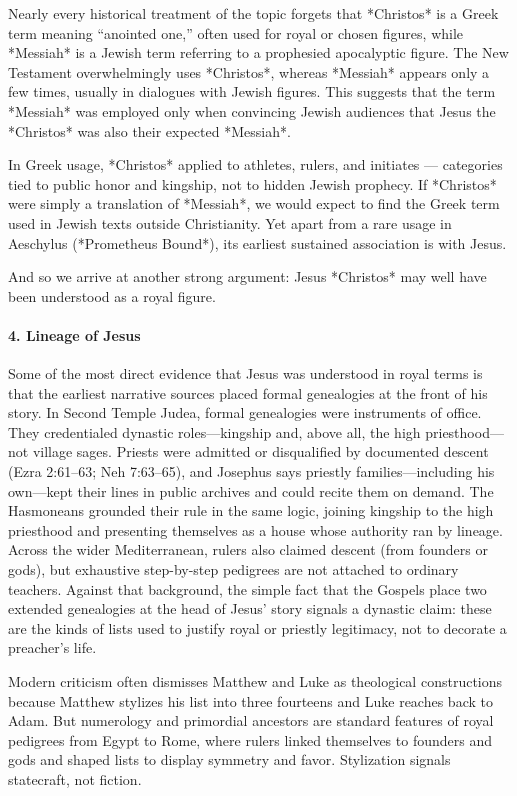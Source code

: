 Nearly every historical treatment of the topic forgets that *Christos* is a Greek term meaning “anointed one,” often used for royal or chosen figures, while *Messiah* is a Jewish term referring to a prophesied apocalyptic figure.
The New Testament overwhelmingly uses *Christos*, whereas *Messiah* appears only a few times, usually in dialogues with Jewish figures.
This suggests that the term *Messiah* was employed only when convincing Jewish audiences that Jesus the *Christos* was also their expected *Messiah*.

In Greek usage, *Christos* applied to athletes, rulers, and initiates — categories tied to public honor and kingship, not to hidden Jewish prophecy.
If *Christos* were simply a translation of *Messiah*, we would expect to find the Greek term used in Jewish texts outside Christianity.
Yet apart from a rare usage in Aeschylus (*Prometheus Bound*), its earliest sustained association is with Jesus.

And so we arrive at another strong argument: Jesus *Christos* may well have been understood as a royal figure.

\paragraph{4.
Lineage of Jesus}\label{par:lineage-of-jesus}

Some of the most direct evidence that Jesus was understood in royal terms is that the earliest narrative sources placed formal genealogies at the front of his story.
In Second Temple Judea, formal genealogies were instruments of office.
They credentialed dynastic roles—kingship and, above all, the high priesthood—not village sages.
Priests were admitted or disqualified by documented descent (Ezra 2:61–63; Neh 7:63–65), and Josephus says priestly families—including his own—kept their lines in public archives and could recite them on demand.
The Hasmoneans grounded their rule in the same logic, joining kingship to the high priesthood and presenting themselves as a house whose authority ran by lineage.
Across the wider Mediterranean, rulers also claimed descent (from founders or gods), but exhaustive step-by-step pedigrees are not attached to ordinary teachers.
Against that background, the simple fact that the Gospels place two extended genealogies at the head of Jesus’ story signals a dynastic claim: these are the kinds of lists used to justify royal or priestly legitimacy, not to decorate a preacher’s life.

Modern criticism often dismisses Matthew and Luke as theological constructions because Matthew stylizes his list into three fourteens and Luke reaches back to Adam.
But numerology and primordial ancestors are standard features of royal pedigrees from Egypt to Rome, where rulers linked themselves to founders and gods and shaped lists to display symmetry and favor.
Stylization signals statecraft, not fiction.

